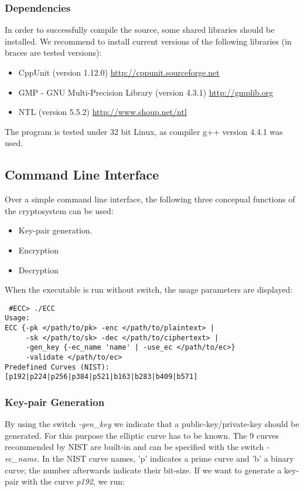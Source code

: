 \documentclass[11pt,english]{article}
\begin{document}
\subsubsection{Dependencies}
In order to successfully compile the source, some shared libraries should be installed. We recommend to install current versions of the following libraries (in braces are tested versions):

\begin{itemize}
 \item CppUnit (version 1.12.0) \url{http://cppunit.sourceforge.net}
 \item GMP - GNU Multi-Precision Library (version 4.3.1) \url{http://gmplib.org}
 \item NTL (version 5.5.2) \url{http://www.shoup.net/ntl}
\end{itemize}

The program is tested under 32 bit Linux, as compiler g++ version 4.4.1 was used.

\subsection{Command Line Interface}
Over a simple command line interface, the following three concepual functions of the cryptosystem can be used:
\begin{itemize}
 \item Key-pair generation.
 \item Encryption
 \item Decryption
\end{itemize}

When the executable is run without switch, the usage parameters are displayed:

\begin{verbatim}
 #ECC> ./ECC
Usage:
ECC {-pk </path/to/pk> -enc </path/to/plaintext> |
     -sk </path/to/sk> -dec </path/to/ciphertext> |
     -gen_key {-ec_name 'name' | -use_ec </path/to/ec>}
     -validate </path/to/ec>
Predefined Curves (NIST): [p192|p224|p256|p384|p521|b163|b283|b409|b571]
\end{verbatim}


\subsubsection{Key-pair Generation}
By using the switch \emph{-gen\_key} we indicate that a public-key/private-key should be generated. For this purpose the elliptic curve has to be known. The 9 curves recommended by NIST are built-in and can be specified with the switch \emph{-ec\_name}. In the NIST curve names, 'p' indicates a prime curve and 'b' a binary curve; the number afterwards indicate their bit-size. If we want to generate a key-pair with the curve \emph{p192}, we run:
\end{document}
